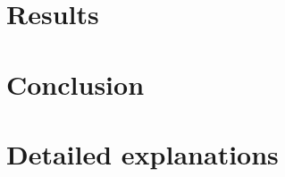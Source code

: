 \documentclass[journal]{IEEEtran}
\begin{document}
\section{Results}


\section{Conclusion}

\appendices

\section{Detailed explanations}





\end{document}
